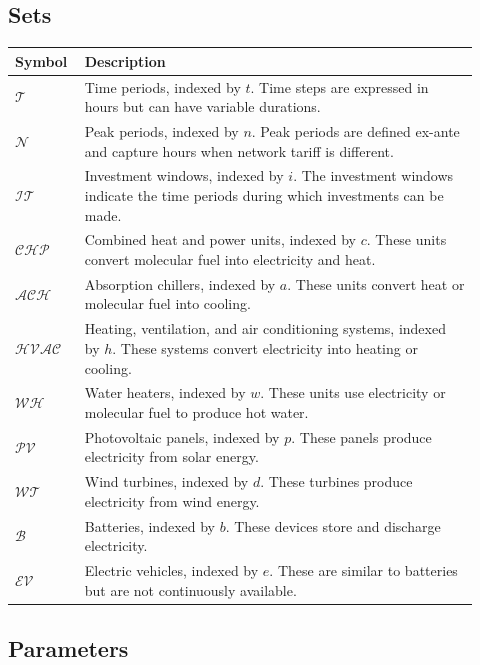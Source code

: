\documentclass[11pt]{article}
\begin{document}
\subsection{Sets}
\label{sec:sets}
\begin{center}
\centering
\begin{tabular}{p{0.12\linewidth}p{0.8\linewidth}}
\hline
\textbf{Symbol} & \textbf{Description} \\
\hline
\(\mathcal{T}\) & Time periods, indexed by \(t\). Time steps are expressed in hours but can have variable durations. \\
\(\mathcal{N}\) & Peak periods, indexed by \(n\). Peak periods are defined ex-ante and capture hours when network tariff is different. \\
\(\mathcal{IT}\) & Investment windows, indexed by \(i\). The investment windows indicate the time periods during which investments can be made. \\
\(\mathcal{CHP}\) & Combined heat and power units, indexed by \(c\). These units convert molecular fuel into electricity and heat. \\
\(\mathcal{ACH}\) & Absorption chillers, indexed by \(a\). These units convert heat or molecular fuel into cooling. \\
\(\mathcal{HVAC}\) & Heating, ventilation, and air conditioning systems, indexed by \(h\). These systems convert electricity into heating or cooling. \\
\(\mathcal{WH}\) & Water heaters, indexed by \(w\). These units use electricity or molecular fuel to produce hot water. \\
\(\mathcal{PV}\) & Photovoltaic panels, indexed by \(p\). These panels produce electricity from solar energy. \\
\(\mathcal{WT}\) & Wind turbines, indexed by \(d\). These turbines produce electricity from wind energy. \\
\(\mathcal{B}\) & Batteries, indexed by \(b\). These devices store and discharge electricity. \\
\(\mathcal{EV}\) & Electric vehicles, indexed by \(e\). These are similar to batteries but are not continuously available. \\
\hline
\end{tabular}
\captionsetup{type=table}
\label{tab:sets}
\end{center}

\subsection{Parameters}
\label{sec:params}
\end{document}
